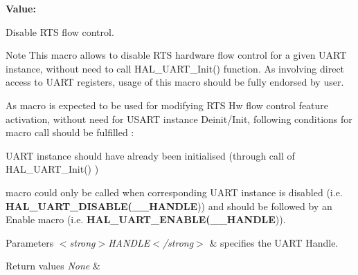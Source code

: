 {\bfseries Value\+:}
\begin{DoxyCode}{0}
\DoxyCodeLine{\textcolor{keywordflow}{do}\{                                                      \(\backslash\)}

\end{DoxyCode}


Disable R\+TS flow control. 

\begin{DoxyNote}{Note}
This macro allows to disable R\+TS hardware flow control for a given U\+A\+RT instance, without need to call H\+A\+L\+\_\+\+U\+A\+R\+T\+\_\+\+Init() function. As involving direct access to U\+A\+RT registers, usage of this macro should be fully endorsed by user. 

As macro is expected to be used for modifying R\+TS Hw flow control feature activation, without need for U\+S\+A\+RT instance Deinit/\+Init, following conditions for macro call should be fulfilled \+:
\begin{DoxyItemize}
\item U\+A\+RT instance should have already been initialised (through call of H\+A\+L\+\_\+\+U\+A\+R\+T\+\_\+\+Init() )
\item macro could only be called when corresponding U\+A\+RT instance is disabled (i.\+e. {\bfseries{H\+A\+L\+\_\+\+U\+A\+R\+T\+\_\+\+D\+I\+S\+A\+B\+LE(\+\_\+\+\_\+\+H\+A\+N\+D\+LE}})) and should be followed by an Enable macro (i.\+e. {\bfseries{H\+A\+L\+\_\+\+U\+A\+R\+T\+\_\+\+E\+N\+A\+B\+LE(\+\_\+\+\_\+\+H\+A\+N\+D\+LE}})). 
\end{DoxyItemize}
\end{DoxyNote}

\begin{DoxyParams}{Parameters}
{\em $<$strong$>$\+H\+A\+N\+D\+L\+E$<$/strong$>$} & specifies the U\+A\+RT Handle. \\
\hline
\end{DoxyParams}

\begin{DoxyRetVals}{Return values}
{\em None} & \\
\hline
\end{DoxyRetVals}
\mbox{\label{group___u_a_r_t___exported___macros_ga017ec9001ff33136f87cc4034b2709a6}} 
